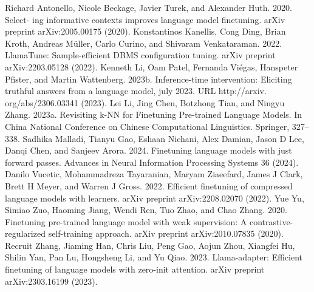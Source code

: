 \documentclass[conference]{IEEEtran}
\begin{document}
\begin{thebibliography}{00}
 Richard Antonello, Nicole Beckage, Javier Turek, and Alexander Huth. 2020. Select- ing informative contexts improves language model finetuning. arXiv preprint arXiv:2005.00175 (2020).
 Konstantinos Kanellis, Cong Ding, Brian Kroth, Andreas Müller, Carlo Curino, and Shivaram Venkataraman. 2022. LlamaTune: Sample-efficient DBMS configuration tuning. arXiv preprint arXiv:2203.05128 (2022).
 Kenneth Li, Oam Patel, Fernanda Viégas, Hanspeter Pfister, and Martin Wattenberg. 2023b. Inference-time intervention: Eliciting truthful answers from a language model, july 2023. URL http://arxiv. org/abs/2306.03341 (2023).
 Lei Li, Jing Chen, Botzhong Tian, and Ningyu Zhang. 2023a. Revisiting k-NN for Finetuning Pre-trained Language Models. In China National Conference on Chinese Computational Linguistics. Springer, 327–338.
 Sadhika Malladi, Tianyu Gao, Eshaan Nichani, Alex Damian, Jason D Lee, Danqi Chen, and Sanjeev Arora. 2024. Finetuning language models with just forward passes. Advances in Neural Information Processing Systems 36 (2024).
 Danilo Vucetic, Mohammadreza Tayaranian, Maryam Ziaeefard, James J Clark, Brett H Meyer, and Warren J Gross. 2022. Efficient finetuning of compressed language models with learners. arXiv preprint arXiv:2208.02070 (2022).
 Yue Yu, Simiao Zuo, Haoming Jiang, Wendi Ren, Tuo Zhao, and Chao Zhang. 2020. Finetuning pre-trained language model with weak supervision: A contrastive- regularized self-training approach. arXiv preprint arXiv:2010.07835 (2020).
 Recruit Zhang, Jiaming Han, Chris Liu, Peng Gao, Aojun Zhou, Xiangfei Hu, Shilin Yan, Pan Lu, Hongsheng Li, and Yu Qiao. 2023. Llama-adapter: Efficient finetuning of language models with zero-init attention. arXiv preprint arXiv:2303.16199 (2023).
\end{thebibliography}
\vspace{12pt}
\color{red}
\end{document}
